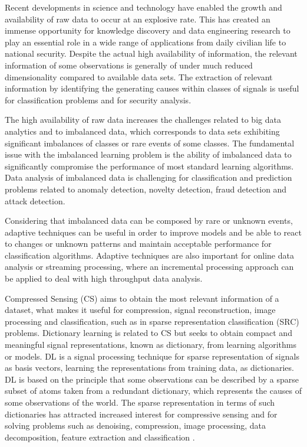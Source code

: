Recent developments in science and technology have enabled the growth and availability of raw data to occur at an explosive rate. This has created an immense opportunity for knowledge discovery and data engineering research to play an essential role in a wide range of applications from daily civilian life to national security. Despite the actual high availability of information, the relevant information of some observations is generally of under much reduced dimensionality compared to available data sets. The extraction of relevant information by identifying the generating causes within classes of signals is useful for classification problems and for security analysis. 

The high availability of raw data increases the challenges related to big data analytics and to imbalanced data, which corresponds to data sets exhibiting significant imbalances of classes or rare events of some classes. The fundamental issue with the imbalanced learning problem is the ability of imbalanced data to significantly compromise the performance of most standard learning algorithms. Data analysis of imbalanced data is challenging for classification and prediction problems related to anomaly detection, novelty detection, fraud detection and attack detection. 

Considering that imbalanced data can be composed by rare or unknown events, adaptive techniques can be useful in order to improve models and be able to react to changes or unknown patterns and maintain acceptable performance for classification algorithms. Adaptive techniques are also important for online data analysis or streaming processing, where an incremental processing approach can be applied to deal with high throughput data analysis.

Compressed Sensing (CS) aims to obtain the most relevant information of a dataset, what makes it useful for compression, signal reconstruction, image processing and classification, such as in sparse representation classification (SRC) problems. Dictionary learning is related to CS but seeks to obtain compact and meaningful signal representations, known as dictionary, from learning algorithms or models. DL is a signal processing technique for sparse representation of signals as basis vectors, learning the representations from training data, as dictionaries. DL is based on the principle that some observations can be described by a sparse subset of atoms taken from a redundant dictionary, which represents the causes of some observations of the world. The sparse representation in terms of such dictionaries has attracted increased interest for compressive sensing and for solving problems such as denoising, compression, image processing, data decomposition, feature extraction and classification \cite{tosic2011dictionary, zhang2010discriminative, zhu2016coupled,ravishankar2011mr}. 

